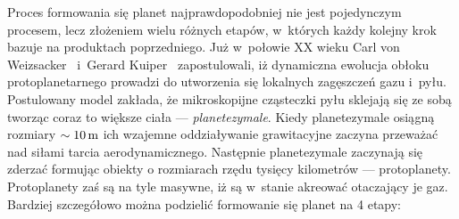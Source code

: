 Proces formowania się planet najprawdopodobniej nie jest pojedynczym procesem,
lecz złożeniem wielu różnych etapów, w~których każdy kolejny krok bazuje na
produktach poprzedniego. Już w~połowie XX wieku Carl von
Weizsacker~\cite*{1943ZA.....22..319W} i~Gerard
Kuiper~\cite*{1951PNAS...37....1K} zapostulowali, iż dynamiczna ewolucja obłoku
protoplanetarnego prowadzi do utworzenia się lokalnych zagęszczeń gazu i~pyłu.
Postulowany model zakłada, że mikroskopijne cząsteczki pyłu sklejają się ze sobą
tworząc coraz to większe ciała --- \emph{planetezymale}. Kiedy planetezymale
osiągną rozmiary $\sim 10\hbox{$\thinspace\textrm{m}$}$ ich wzajemne oddziaływanie grawitacyjne zaczyna
przeważać nad siłami tarcia aerodynamicznego. Następnie planetezymale zaczynają
się zderzać formując obiekty o rozmiarach rzędu tysięcy kilometrów ---
protoplanety. Protoplanety zaś są na tyle masywne, iż są w~stanie akreować
otaczający je gaz. Bardziej szczegółowo można podzielić formowanie się planet na
4 etapy:

